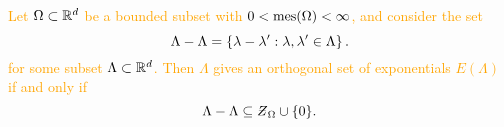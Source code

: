 \documentclass[../thesis.tex]{subfiles}
\begin{document}
\textcolor{orange}{  %
\begin{lemma}\label{lem:zero_set_orthoganl_general}
    Let $\Omega \subset \mathbb{R}^d$ be a bounded subset with $0< \operatorname{mes}(\Omega)<\infty$, and consider the set
    \begin{equation}\label{eq:zero_set_orthogonal}
        \Lambda - \Lambda = \left\{\lambda-\lambda' : \lambda,\lambda' \in \Lambda\right\}.
    \end{equation}
    for some subset $\Lambda\subset \mathbb{R}^d$. Then $\Lambda$ gives an orthogonal set of exponentials $E(\Lambda)$ if and only if
    \begin{equation}\label{eq:zero_set_inclusion_original}
        \Lambda - \Lambda \subseteq \Zstroke_{\Omega} \cup \braq{0}.
    \end{equation}
\end{lemma}
} %
\end{document}
